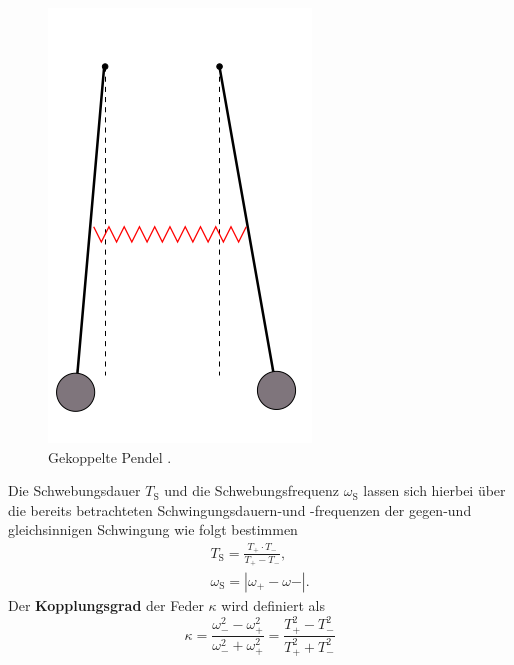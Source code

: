 \begin{figure}
	\centering
	\includegraphics[width=0.4\linewidth]{Bilder/gekoppelt.png}
	\caption{Gekoppelte Pendel \cite{Anleitung}.}
	\label{fig:schwebe}

\end{figure}
\FloatBarrier
Die Schwebungsdauer $T_{\mathrm{S}}$ und die Schwebungsfrequenz $\omega_{\mathrm{S}}$ lassen sich hierbei über die bereits betrachteten Schwingungsdauern-und -frequenzen der gegen-und gleichsinnigen Schwingung wie folgt bestimmen
\begin{gather}
	\label{eqn:twschwebe}
	T_{\mathrm{S}}=\frac{T_{\mathrm{+}}\cdot T_{\mathrm{-}}}{T_{\mathrm{+}}-T_{\mathrm{-}}} \text{,}\\
	\omega_{\mathrm{S}}=|\omega_{\mathrm{+}}-\omega{\mathrm{-}}| \text{.}
\end{gather}
Der \textbf{Kopplungsgrad} der Feder $\kappa$ wird definiert als
\begin{equation}
	\label{eqn:kappa}
	\kappa=\frac{\omega_{\mathrm{-}}^2-\omega_{\mathrm{+}}^2}{\omega_{\mathrm{-}}^2+\omega_{\mathrm{+}}^2}=\frac{T_{\mathrm{+}}^2-T_{\mathrm{-}}^2}{T_{\mathrm{+}}^2+T_{\mathrm{-}}^2}
\end{equation}
